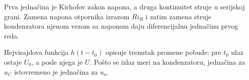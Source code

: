 Prva jednačina je Kirhofov zakon napona, a druga kontinuitet struje u serijskoj grani. Zamena napona otpornika izrazom $Ri_R$ i zatim zamena struje kondenzatora njenom vezom sa naponom daju diferencijalnu jednačinu prvog reda.

Hejvisajdova funkcija $h(t-t_0)$ opisuje trenutak promene pobude: pre $t_0$ ulaz ostaje $U_0$, a posle njega je $U$. Pošto se izlaz meri na kondenzatoru, jednačina za $u_C$ istovremeno je jednačina za $u_o$.
